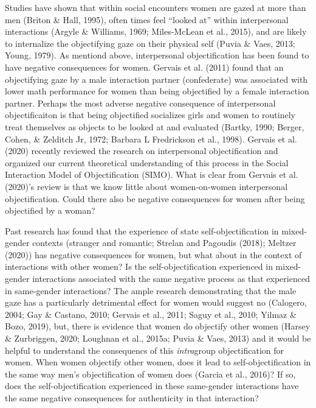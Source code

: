 \documentclass[man]{apa6}
\begin{document}
Studies have shown that within social encounters women are gazed at more
than men (Briton \& Hall, 1995), often times feel \enquote{looked at}
within interpersonal interactions (Argyle \& Williams, 1969;
Miles-McLean et al., 2015), and are likely to internalize the
objectifying gaze on their physical self (Puvia \& Vaes, 2013; Young,
1979). As mentiond above, interpersonal objectification has been found
to have negative consequences for women. Gervais et al. (2011) found
that an objectifying gaze by a male interaction partner (confederate)
was associated with lower math performance for women than being
objectified by a female interaction partner. Perhaps the most adverse
negative consequence of interpersonal objectificaiton is that being
objectified socializes girls and women to routinely treat themselves as
objects to be looked at and evaluated (Bartky, 1990; Berger, Cohen, \&
Zelditch Jr, 1972; Barbara L Fredrickson et al., 1998). Gervais et al.
(2020) recently reviewed the research on interpersonal objectification
and organized our current theoretical understanding of this process in
the Social Interaction Model of Objectification (SIMO). What is clear
from Gervais et al. (2020)'s review is that we know little about
women-on-women interpersonal objectification. Could there also be
negative consequences for women after being objectified by a woman?

Past research has found that the experience of state
self-objectification in mixed-gender contexts (stranger and romantic;
Strelan and Pagoudis (2018); Meltzer (2020)) has negative consequences
for women, but what about in the context of interactions with other
women? Is the self-objectification experienced in mixed-gender
interactions associated with the same negative process as that
experienced in same-gender interactions? The ample research
demonstrating that the male gaze has a particularly detrimental effect
for women would suggest no (Calogero, 2004; Gay \& Castano, 2010;
Gervais et al., 2011; Saguy et al., 2010; Yilmaz \& Bozo, 2019), but,
there is evidence that women do objectify other women (Harsey \&
Zurbriggen, 2020; Loughnan et al., 2015a; Puvia \& Vaes, 2013) and it
would be helpful to understand the consequencs of this \emph{intra}group
objectification for women. When women objectify other women, does it
lead to self-objectification in the same way men's objectification of
women does (Garcia et al., 2016)? If so, does the self-objectification
experienced in these same-gender interactions have the same negative
consequences for authenticity in that interaction?
\end{document}
